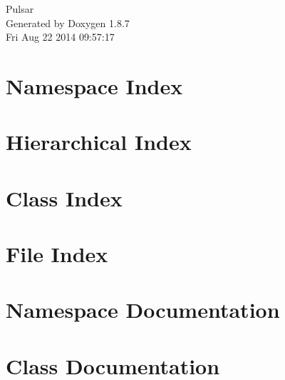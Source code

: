 \documentclass[twoside]{book}
\newcommand{\+}{\discretionary{\mbox{\scriptsize$\hookleftarrow$}}{}{}}
\newcommand{\clearemptydoublepage}{%
  \newpage{\pagestyle{empty}\cleardoublepage}%
}
\begin{document}
\hypersetup{pageanchor=false,
             bookmarks=true,
             bookmarksnumbered=true,
             pdfencoding=unicode
            }
\begin{titlepage}
\vspace*{7cm}
\begin{center}%
{\Large Pulsar }\\
\vspace*{1cm}
{\large Generated by Doxygen 1.8.7}\\
\vspace*{0.5cm}
{\small Fri Aug 22 2014 09:57:17}\\
\end{center}
\end{titlepage}
\clearemptydoublepage
\tableofcontents
\clearemptydoublepage
{}
\hypersetup{pageanchor=true}

\chapter{Namespace Index}

\chapter{Hierarchical Index}

\chapter{Class Index}

\chapter{File Index}

\chapter{Namespace Documentation}

\chapter{Class Documentation}



















\end{document}
